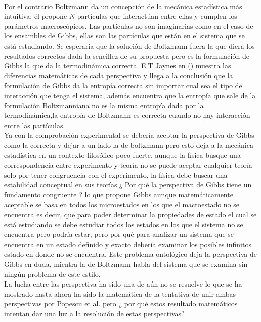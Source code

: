 \\
Por el contrario Boltzmann da un concepción de la mecánica estadística más intuitiva; él propone $N$ partículas que interactúan entre ellas y cumplen los parámetros macroscópicos. Las partículas no son imaginarias como en el caso de los ensambles de Gibbs, ellas son las partículas que están en el sistema que se está estudiando. Se esperaría que la solución de Boltzmann fuera la que diera los resultados correctos dada la sencillez de su propuesta pero es la formulación de Gibbs la que da la termodinámica correcta. E.T Jaynes en () muestra las diferencias matemáticas de cada perspectiva y llega a la conclusión que la formulación de Gibbs da la entropía correcta sin importar cual sea el tipo de interacción que tenga el sistema, además encuentra que la entropía que sale de la formulación Boltzmanniana no es la misma entropía dada por la termodinámica,la entropía de Boltzmann es correcta cuando no hay interacción entre las partículas.
\\
Ya con la comprobación experimental se debería aceptar la perspectiva de Gibbs como la correcta y dejar a un lado la de boltzmann pero esto deja a la mecánica estadística en un contexto filosófico poco fuerte, aunque la física busque una correspondencia entre experimento y teoría no se puede aceptar cualquier teoría solo por tener congruencia con el experimento, la física debe buscar una estabilidad conceptual en sus teorías.¿ Por qué la perspectiva de Gibbs tiene un fundamento congruente ?  lo que propone Gibbs aunque matemáticamente aceptable se basa en todos los microestados en los que el macroestado no se encuentra es decir, que para poder determinar la propiedades de estado el cual se está estudiando se debe estudiar todos los estados en los que el sistema no se encuentra pero podría estar, pero por qué para analizar un sistema que se encuentra en un estado definido y exacto debería examinar los posibles infinitos estado en donde no se encuentra. Este problema ontológico deja la perspectiva de Gibbs en duda, mientra la de Boltzmann habla del sistema que se examina sin ningún problema de este estilo. 
\\
La lucha entre las perspectiva ha sido una de aún no se resuelve lo que se ha mostrado hasta ahora ha sido la matemática de la tentativa de unir ambas perspectivas por Popescu et al. pero ¿ por qué estos resultado matemáticos intentan dar una luz a la resolución de estas perspectivas?
\\

